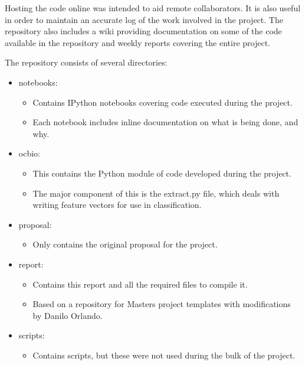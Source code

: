Hosting the code online was intended to aid remote collaborators.
It is also useful in order to maintain an accurate log of the work involved in the project.
The repository also includes a wiki\cite{opencastbiowiki} providing documentation on some of the code available in the repository and weekly reports covering the entire project.

The repository consists of several directories:

\begin{itemize}
    \item notebooks:
        \begin{itemize}
            \item Contains IPython notebooks covering code executed during the project.
            \item Each notebook includes inline documentation on what is being done, and why.
        \end{itemize}
    \item ocbio:
        \begin{itemize}
            \item This contains the Python module of code developed during the project.
            \item The major component of this is the extract.py file, which deals with writing feature vectors for use in classification.
        \end{itemize}
    \item proposal:
        \begin{itemize}
            \item Only contains the original proposal for the project.
        \end{itemize}
    \item report:
        \begin{itemize}
            \item Contains this report and all the required files to compile it.
            \item Based on a repository for Masters project templates\cite{ug4template} with modifications by Danilo Orlando.
        \end{itemize}
    \item scripts:
        \begin{itemize}
            \item Contains scripts, but these were not used during the bulk of the project.
        \end{itemize}
\end{itemize}

